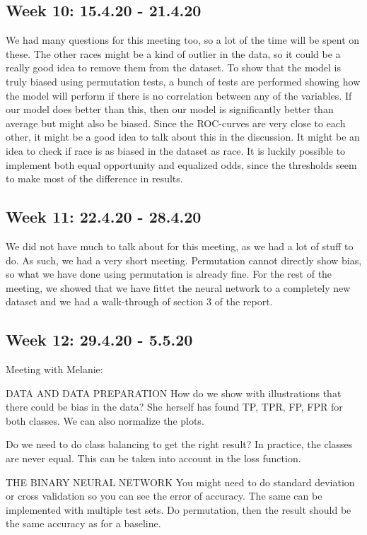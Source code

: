 \documentclass[11pt, fleqn]{article}
\begin{document}
\subsection*{Week 10: 15.4.20 - 21.4.20}
We had many questions for this meeting too, so a lot of the time will be spent on these. The other races might be a kind of outlier in the data, so it could be a really good idea to remove them from the dataset. To show that the model is truly biased using permutation tests, a bunch of tests are performed showing how the model will perform if there is no correlation between any of the variables. If our model does better than this, then our model is significantly better than average but might also be biased. Since the ROC-curves are very close to each other, it might be a good idea to talk about this in the discussion. It might be an idea to check if race is as biased in the dataset as race. It is luckily possible to implement both equal opportunity and equalized odds, since the thresholds seem to make most of the difference in results.

\subsection*{Week 11: 22.4.20 - 28.4.20}
We did not have much to talk about for this meeting, as we had a lot of stuff to do. As such, we had a very short meeting. Permutation cannot directly show bias, so what we have done using permutation is already fine. For the rest of the meeting, we showed that we have fittet the neural network to a completely new dataset and we had a walk-through of section 3 of the report.

\subsection*{Week 12: 29.4.20 - 5.5.20}
Meeting with Melanie:

DATA AND DATA PREPARATION
How do we show with illustrations that there could be bias in the data?
She herself has found TP, TPR, FP, FPR for both classes. We can also normalize the plots.


Do we need to do class balancing to get the right result?
In practice, the classes are never equal. This can be taken into account in the loss function.

THE BINARY NEURAL NETWORK
You might need to do standard deviation or cross validation so you can see the error of accuracy.
The same can be implemented with multiple test sets.
Do permutation, then the result should be the same accuracy as for a baseline.
\end{document}
